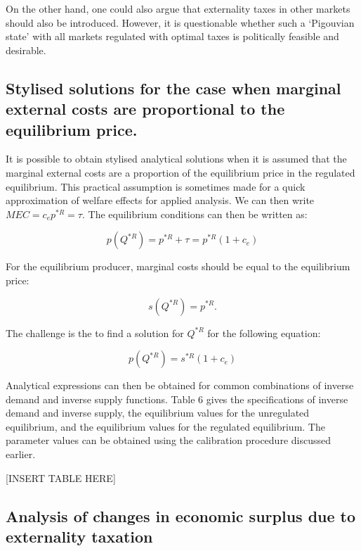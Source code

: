 \documentclass[
]{book}
\begin{document}
On the other hand, one could also argue that externality taxes in other markets should also be introduced. However, it is questionable whether such a `Pigouvian state' with all markets regulated with optimal taxes is politically feasible and desirable.

\hypertarget{stylised-solutions-for-the-case-when-marginal-external-costs-are-proportional-to-the-equilibrium-price.}{%
\subsection{Stylised solutions for the case when marginal external costs are proportional to the equilibrium price.}\label{stylised-solutions-for-the-case-when-marginal-external-costs-are-proportional-to-the-equilibrium-price.}}

It is possible to obtain stylised analytical solutions when it is assumed that the marginal external costs are a proportion of the equilibrium price in the regulated equilibrium. This practical assumption is sometimes made for a quick approximation of welfare effects for applied analysis. We can then write \(MEC=c_e p^{*R}=\tau\). The equilibrium conditions can then be written as:

\begin{equation}
p(Q^{* R}) = p^{* R} + \tau = p^{* R} (1 + c_e)
\end{equation}

For the equilibrium producer, marginal costs should be equal to the equilibrium price:

\begin{equation}
s(Q^{* R} )=p^{* R}.
\end{equation}

The challenge is the to find a solution for \(Q^{* R}\) for the following equation:

\begin{equation}
p(Q^{* R}) = s^{* R} (1 + c_e)
\end{equation}

Analytical expressions can then be obtained for common combinations of inverse demand and inverse supply functions. Table 6 gives the specifications of inverse demand and inverse supply, the equilibrium values for the unregulated equilibrium, and the equilibrium values for the regulated equilibrium. The parameter values can be obtained using the calibration procedure discussed earlier.

{[}INSERT TABLE HERE{]}

\hypertarget{analysis-of-changes-in-economic-surplus-due-to-externality-taxation}{%
\subsection{Analysis of changes in economic surplus due to externality taxation}\label{analysis-of-changes-in-economic-surplus-due-to-externality-taxation}}
\end{document}
